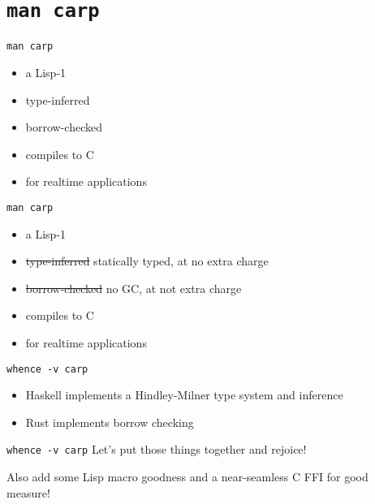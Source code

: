 \documentclass{beamer}
\begin{document}
  \section{\texttt{man carp}}
  \begin{frame}{\texttt{man carp}}
    \begin{itemize}
      \item a Lisp-1
      \item type-inferred
      \item borrow-checked
      \item compiles to C
      \item for realtime applications
    \end{itemize}
  \end{frame}
  \begin{frame}{\texttt{man carp}}
    \begin{itemize}
      \item a Lisp-1
      \item \sout{type-inferred} statically typed, at no extra charge
      \item \sout{borrow-checked} no GC, at not extra charge
      \item compiles to C
      \item for realtime applications
    \end{itemize}
  \end{frame}
  \begin{frame}{\texttt{whence -v carp}}
    \begin{itemize}
      \item Haskell implements a Hindley-Milner type system and inference
      \item Rust implements borrow checking
    \end{itemize}
  \end{frame}
  \begin{frame}{\texttt{whence -v carp}}
    Let’s put those things together and rejoice!
    \begin{arrowlist}
      \item Also add some Lisp macro goodness and a near-seamless C FFI for good measure!
    \end{arrowlist}
  \end{frame}
\end{document}
